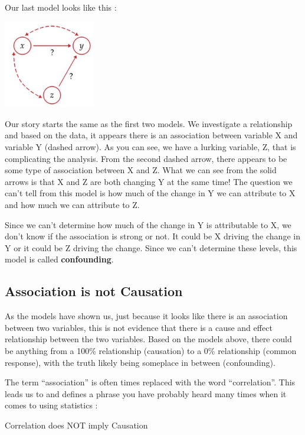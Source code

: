 \documentclass[
  letterpaper,
  DIV=11,
  numbers=noendperiod]{scrreprt}
\begin{document}
Our last model looks like this :

\includegraphics[width=0.3\textwidth,height=\textheight]{./images/IDV_3.jpg}

Our story starts the same as the first two models. We investigate a
relationship and based on the data, it appears there is an association
between variable X and variable Y (dashed arrow). As you can see, we
have a lurking variable, Z, that is complicating the analysis. From the
second dashed arrow, there appears to be some type of association
between X and Z. What we can see from the solid arrows is that X and Z
are both changing Y at the same time! The question we can't tell from
this model is how much of the change in Y we can attribute to X and how
much we can attribute to Z.

Since we can't determine how much of the change in Y is attributable to
X, we don't know if the association is strong or not. It could be X
driving the change in Y or it could be Z driving the change. Since we
can't determine these levels, this model is called \textbf{confounding}.

\subsection*{Association is not
Causation}\label{association-is-not-causation}

As the models have shown us, just because it looks like there is an
association between two variables, this is not evidence that there is a
cause and effect relationship between the two variables. Based on the
models above, there could be anything from a 100\% relationship
(causation) to a 0\% relationship (common response), with the truth
likely being someplace in between (confounding).

The term ``association'' is often times replaced with the word
``correlation''. This leads us to and defines a phrase you have probably
heard many times when it comes to using statistics :

\begin{tcolorbox}[enhanced jigsaw, colbacktitle=quarto-callout-important-color!10!white, colframe=quarto-callout-important-color-frame, opacitybacktitle=0.6, rightrule=.15mm, title=\textcolor{quarto-callout-important-color}{\faExclamation}\hspace{0.5em}{Important}, colback=white, coltitle=black, breakable, leftrule=.75mm, toptitle=1mm, bottomrule=.15mm, opacityback=0, bottomtitle=1mm, titlerule=0mm, left=2mm, toprule=.15mm, arc=.35mm]

Correlation does NOT imply Causation

\end{tcolorbox}
\end{document}
